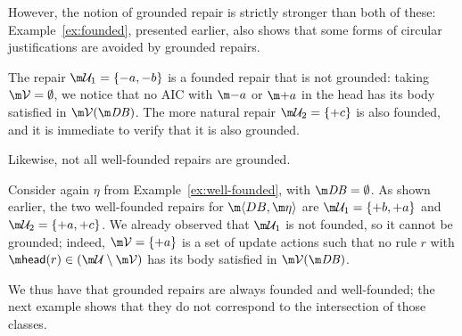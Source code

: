However, the notion of grounded repair is strictly stronger than both of these: Example~\ref{ex:founded}, presented earlier, also shows that some forms of circular justifications are avoided by grounded repairs.
\begin{example}
  \label{ex:founded-gr}
  The repair $\UU_1=\{-a,-b\}$ is a founded repair that is not grounded: taking
  $\VV=\emptyset$, we notice that no AIC with $\remove a$ or $\add a$ in the head has its body satisfied in $\VV(\db)$. %
  The more natural repair $\UU_2=\{+c\}$ is also founded, and it is immediate to verify that it is also grounded.
\end{example}


Likewise, not all well-founded repairs are grounded. %
\begin{example}
  Consider again $\eta$ from Example~\ref{ex:well-founded}, with $\db=\emptyset$.
  As shown earlier, the two well-founded repairs for $\fulldb$ are $\UU_1=\{{+b},{+a}\}$ and $\UU_2=\{{+a},{+c}\}$.
  We already observed that $\UU_1$ is not founded, so it cannot be grounded; indeed,
  $\VV = \{{+a}\}$ is a set of update actions such that no rule $r$ with
  $\head(r)\in(\UU\setminus\VV)$
  has its body satisfied in $\VV(\db)$. %
\end{example}



We thus have that grounded repairs are always founded and well-founded; the next example shows that they do not correspond to the intersection of those classes.

